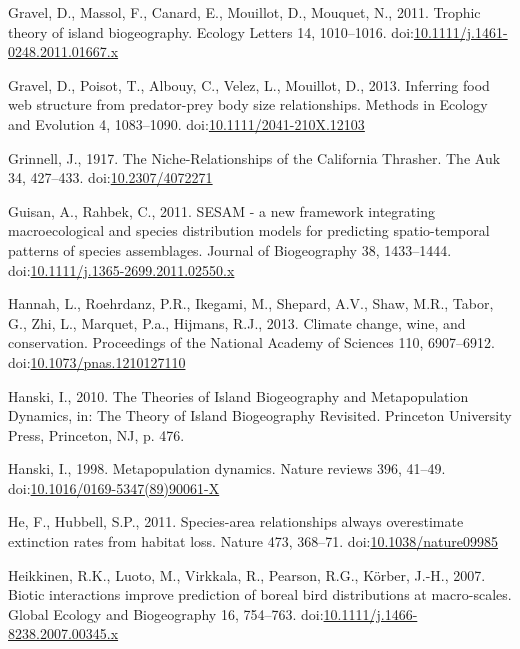 \hypertarget{ref-Gravel2011}{}
Gravel, D., Massol, F., Canard, E., Mouillot, D., Mouquet, N., 2011.
Trophic theory of island biogeography. Ecology Letters 14, 1010--1016.
doi:\href{https://doi.org/10.1111/j.1461-0248.2011.01667.x}{10.1111/j.1461-0248.2011.01667.x}

\hypertarget{ref-Gravel2013a}{}
Gravel, D., Poisot, T., Albouy, C., Velez, L., Mouillot, D., 2013.
Inferring food web structure from predator-prey body size relationships.
Methods in Ecology and Evolution 4, 1083--1090.
doi:\href{https://doi.org/10.1111/2041-210X.12103}{10.1111/2041-210X.12103}

\hypertarget{ref-Grinnell1917a}{}
Grinnell, J., 1917. The Niche-Relationships of the California Thrasher.
The Auk 34, 427--433.
doi:\href{https://doi.org/10.2307/4072271}{10.2307/4072271}

\hypertarget{ref-Guisan2011}{}
Guisan, A., Rahbek, C., 2011. SESAM - a new framework integrating
macroecological and species distribution models for predicting
spatio-temporal patterns of species assemblages. Journal of Biogeography
38, 1433--1444.
doi:\href{https://doi.org/10.1111/j.1365-2699.2011.02550.x}{10.1111/j.1365-2699.2011.02550.x}

\hypertarget{ref-Hannah2013}{}
Hannah, L., Roehrdanz, P.R., Ikegami, M., Shepard, A.V., Shaw, M.R.,
Tabor, G., Zhi, L., Marquet, P.a., Hijmans, R.J., 2013. Climate change,
wine, and conservation. Proceedings of the National Academy of Sciences
110, 6907--6912.
doi:\href{https://doi.org/10.1073/pnas.1210127110}{10.1073/pnas.1210127110}

\hypertarget{ref-Hanski2010}{}
Hanski, I., 2010. The Theories of Island Biogeography and Metapopulation
Dynamics, in: The Theory of Island Biogeography Revisited. Princeton
University Press, Princeton, NJ, p. 476.

\hypertarget{ref-Hanski1998}{}
Hanski, I., 1998. Metapopulation dynamics. Nature reviews 396, 41--49.
doi:\href{https://doi.org/10.1016/0169-5347(89)90061-X}{10.1016/0169-5347(89)90061-X}

\hypertarget{ref-He2011}{}
He, F., Hubbell, S.P., 2011. Species-area relationships always
overestimate extinction rates from habitat loss. Nature 473, 368--71.
doi:\href{https://doi.org/10.1038/nature09985}{10.1038/nature09985}

\hypertarget{ref-Heikkinen2007}{}
Heikkinen, R.K., Luoto, M., Virkkala, R., Pearson, R.G., Körber, J.-H.,
2007. Biotic interactions improve prediction of boreal bird
distributions at macro-scales. Global Ecology and Biogeography 16,
754--763.
doi:\href{https://doi.org/10.1111/j.1466-8238.2007.00345.x}{10.1111/j.1466-8238.2007.00345.x}

